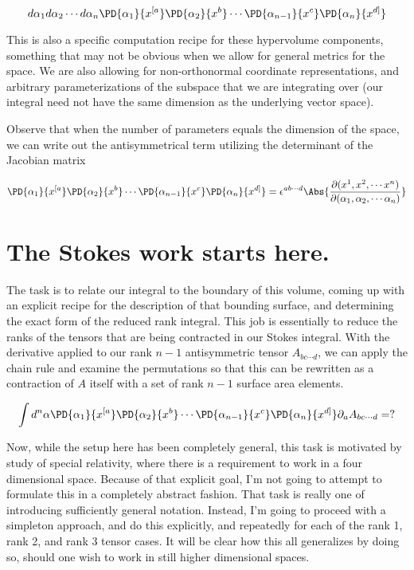 \begin{equation}\label{eqn:stokesTensor:n}
d\alpha_1
d\alpha_2
\cdots
d\alpha_n
\PD{\alpha_1}{x^{[a}}
\PD{\alpha_2}{x^b}
\cdots
\PD{\alpha_{n-1}}{x^c}
\PD{\alpha_n}{x^{d]}}
\end{equation}

This is also a specific computation recipe for these hypervolume components, something that may not be obvious when we allow for general metrics for the space.  We are also allowing for non-orthonormal coordinate representations, and arbitrary parameterizations of the subspace that we are integrating over (our integral need not have the same dimension as the underlying vector space).

Observe that when the number of parameters equals the dimension of the space, we can write out the antisymmetrical term utilizing the determinant of the Jacobian matrix

\begin{equation}\label{eqn:stokesTensor:n}
\PD{\alpha_1}{x^{[a}}
\PD{\alpha_2}{x^b}
\cdots
\PD{\alpha_{n-1}}{x^c}
\PD{\alpha_n}{x^{d]}}
= \epsilon^{a b \cdots d} \Abs{ \frac{\partial(x^1, x^2, \cdots x^n)}{\partial(\alpha_1, \alpha_2, \cdots \alpha_n)} }
\end{equation}

\section{The Stokes work starts here.}

The task is to relate our integral to the boundary of this volume, coming up with an explicit recipe for the description of that bounding surface, and determining the exact form of the reduced rank integral.  This job is essentially to reduce the ranks of the tensors that are being contracted in our Stokes integral.  With the derivative applied to our rank $n-1$ antisymmetric tensor $A_{b c \cdots d}$, we can apply the chain rule and examine the permutations so that this can be rewritten as a contraction of $A$ itself with a set of rank $n-1$ surface area elements.

\begin{equation}\label{eqn:stokesTensor:n}
\int
d^n \alpha
\PD{\alpha_1}{x^{[a}}
\PD{\alpha_2}{x^b}
\cdots
\PD{\alpha_{n-1}}{x^c}
\PD{\alpha_n}{x^{d]}}
\partial_a A_{b c \cdots d} = ?
\end{equation}

Now, while the setup here has been completely general, this task is motivated by study of special relativity, where there is a requirement to work in a four dimensional space.  Because of that explicit goal, I'm not going to attempt to formulate this in a completely abstract fashion.  That task is really one of introducing sufficiently general notation.  Instead, I'm going to proceed with a simpleton approach, and do this explicitly, and repeatedly for each of the rank 1, rank 2, and rank 3 tensor cases.  It will be clear how this all generalizes by doing so, should one wish to work in still higher dimensional spaces.

